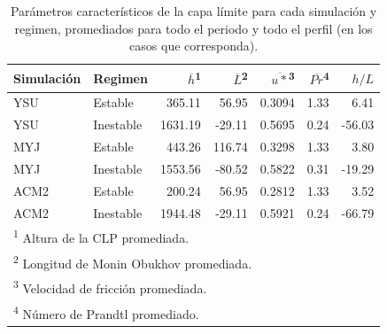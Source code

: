 \documentclass[12pt,spanish,oneside, a4paper]{book}
\begin{document}
\begin{table}

\caption{\label{tab:tabla-clp}Parámetros característicos de la capa límite para cada simulación y regimen, promediados para todo el periodo y todo el perfil (en los casos que corresponda). \label{tabla-clp}}
\centering
\begin{tabular}[t]{llrrrrr}
\toprule
Simulación & Regimen & $\overline{h}$\textsuperscript{1} & $\overline{L}$\textsuperscript{2} & $\overline{u*}$\textsuperscript{3} & $\overline{Pr}$\textsuperscript{4} & $h/L$\\
\midrule
YSU & Estable & 365.11 & 56.95 & 0.3094 & 1.33 & 6.41\\
YSU & Inestable & 1631.19 & -29.11 & 0.5695 & 0.24 & -56.03\\
MYJ & Estable & 443.26 & 116.74 & 0.3298 & 1.33 & 3.80\\
MYJ & Inestable & 1553.56 & -80.52 & 0.5822 & 0.31 & -19.29\\
ACM2 & Estable & 200.24 & 56.95 & 0.2812 & 1.33 & 3.52\\
ACM2 & Inestable & 1944.48 & -29.11 & 0.5921 & 0.24 & -66.79\\
\bottomrule
\multicolumn{7}{l}{\textsuperscript{1} Altura de la CLP promediada.}\\
\multicolumn{7}{l}{\textsuperscript{2} Longitud de Monin Obukhov promediada.}\\
\multicolumn{7}{l}{\textsuperscript{3} Velocidad de fricción promediada.}\\
\multicolumn{7}{l}{\textsuperscript{4} Número de Prandtl promediado.}\\
\end{tabular}
\end{table}
\end{document}
